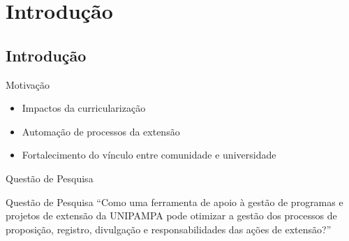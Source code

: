 
\section{Introdução}
\subsection*{Introdução}


\begin{frame}{{\sffamily Motivação}}
\begin{block}{}
    \begin{itemize}%
		\item Impactos da curricularização %
		\item Automação de processos da extensão %
		\item Fortalecimento do vínculo entre comunidade e universidade %
	\end{itemize}
\end{block}
\end{frame}

\begin{frame}{{\sffamily Questão de Pesquisa}}
\begin{block}{Questão de Pesquisa}
“Como uma ferramenta de apoio à gestão de programas e projetos de extensão da UNIPAMPA pode otimizar a gestão dos processos de proposição, registro, divulgação e responsabilidades das ações de extensão?” 
\end{block}
\end{frame}

